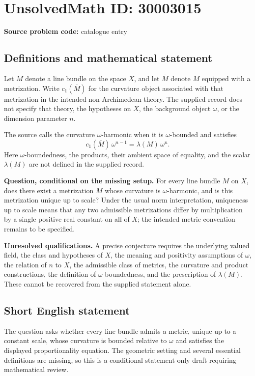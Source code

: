 \documentclass[11pt]{article}
\begin{document}
\section*{UnsolvedMath ID: 30003015}
\textbf{Source problem code:} catalogue entry
\subsection{Definitions and mathematical statement}
Let \(M\) denote a line bundle on the space \(X\), and let \(\overline{M}\) denote \(M\) equipped with a metrization. Write \(c_1(\overline{M})\) for the curvature object associated with that metrization in the intended non-Archimedean theory. The supplied record does not specify that theory, the hypotheses on \(X\), the background object \(\omega\), or the dimension parameter \(n\).

The source calls the curvature \(\omega\)-harmonic when it is \(\omega\)-bounded and satisfies
\[
 c_1(\overline{M})\,\omega^{n-1}=\lambda(M)\,\omega^n.
\]
Here \(\omega\)-boundedness, the products, their ambient space of equality, and the scalar \(\lambda(M)\) are not defined in the supplied record.

\textbf{Question, conditional on the missing setup.} For every line bundle \(M\) on \(X\), does there exist a metrization \(\overline{M}\) whose curvature is \(\omega\)-harmonic, and is this metrization unique up to scale? Under the usual norm interpretation, uniqueness up to scale means that any two admissible metrizations differ by multiplication by a single positive real constant on all of \(X\); the intended metric convention remains to be specified.

\textbf{Unresolved qualifications.} A precise conjecture requires the underlying valued field, the class and hypotheses of \(X\), the meaning and positivity assumptions of \(\omega\), the relation of \(n\) to \(X\), the admissible class of metrics, the curvature and product constructions, the definition of \(\omega\)-boundedness, and the prescription of \(\lambda(M)\). These cannot be recovered from the supplied statement alone.
\subsection{Short English statement}
The question asks whether every line bundle admits a metric, unique up to a constant scale, whose curvature is bounded relative to \(\omega\) and satisfies the displayed proportionality equation. The geometric setting and several essential definitions are missing, so this is a conditional statement-only draft requiring mathematical review.
\end{document}

